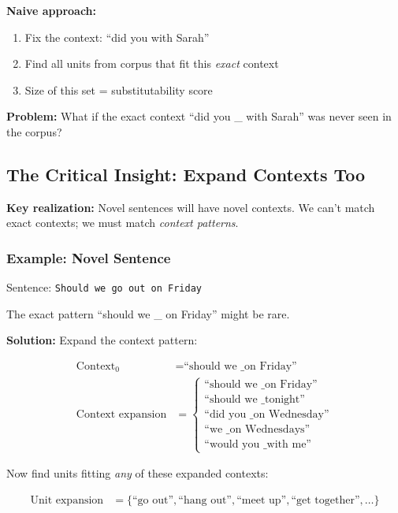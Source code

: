 \documentclass[11pt]{article}
\begin{document}
\textbf{Naive approach:}
\begin{enumerate}
\item Fix the context: ``did you \underline{\phantom{XX}} with Sarah''
\item Find all units from corpus that fit this \emph{exact} context
\item Size of this set = substitutability score
\end{enumerate}

\textbf{Problem:} What if the exact context ``did you \_ with Sarah'' was never seen in the corpus?

\subsection{The Critical Insight: Expand Contexts Too}

\textbf{Key realization:} Novel sentences will have novel contexts. We can't match exact contexts; we must match \emph{context patterns}.

\subsubsection{Example: Novel Sentence}

Sentence: \texttt{Should we go out on Friday}

The exact pattern ``should we \_ on Friday'' might be rare.

\textbf{Solution:} Expand the context pattern:

\begin{align*}
\text{Context}_0 &= \text{``should we \_ on Friday''} \\
\text{Context expansion} &= \begin{cases}
\text{``should we \_ on Friday''} \\
\text{``should we \_ tonight''} \\
\text{``did you \_ on Wednesday''} \\
\text{``we \_ on Wednesdays''} \\
\text{``would you \_ with me''}
\end{cases}
\end{align*}

Now find units fitting \emph{any} of these expanded contexts:

\begin{align*}
\text{Unit expansion} &= \{\text{``go out''}, \text{``hang out''}, \text{``meet up''}, \text{``get together''}, \ldots\}
\end{align*}
\end{document}
